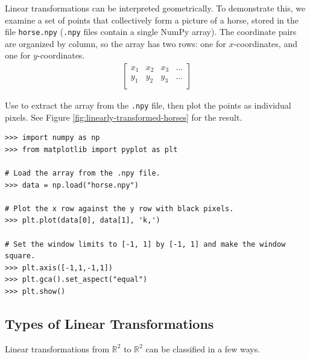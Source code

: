 Linear transformations can be interpreted geometrically.
To demonstrate this, we examine a set of points that collectively form a picture of a horse, stored in the file \texttt{horse.npy} (\texttt{.npy} files contain a single NumPy array).
The coordinate pairs are organized by column, so the array has two rows: one for $x$-coordinates, and one for $y$-coordinates.
%
\begin{align*}
\left[\begin{array}{cccc}
x_1 & x_2 & x_3 & \ldots \\
y_1 & y_2 & y_3 & \ldots \\
\end{array}\right]
\end{align*}

Use  to extract the array from the \texttt{.npy} file, then plot the points as individual pixels.
See Figure \ref{fig:linearly-transformed-horses} for the result.

\begin{lstlisting}
>>> import numpy as np
>>> from matplotlib import pyplot as plt

# Load the array from the .npy file.
>>> data = np.load("horse.npy")

# Plot the x row against the y row with black pixels.
>>> plt.plot(data[0], data[1], 'k,')

# Set the window limits to [-1, 1] by [-1, 1] and make the window square.
>>> plt.axis([-1,1,-1,1])
>>> plt.gca().set_aspect("equal")
>>> plt.show()
\end{lstlisting}

\subsection*{Types of Linear Transformations} %

Linear transformations from $\mathbb{R}^2$ to $\mathbb{R}^2$ can be classified in a few ways.

